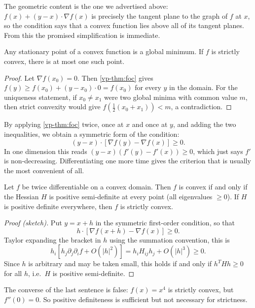The geometric content is the one we advertised above: $f(x) + (y - x)\cdot\nabla f(x)$ is precisely the tangent plane to the graph of $f$ at $x$, so the condition says that a convex function lies above all of its tangent planes. From this the promised simplification is immediate.

\begin{corollary}
	Any stationary point of a convex function is a global minimum. If $f$ is strictly convex, there is at most one such point.
\end{corollary}
\begin{proof}
	Let $\nabla f(x_0) = 0$. Then \autoref{vp-thm:foc} gives $f(y) \geq f(x_0) + (y - x_0)\cdot 0 = f(x_0)$ for every $y$ in the domain. For the uniqueness statement, if $x_0 \neq x_1$ were two global minima with common value $m$, then strict convexity would give $f(\frac{1}{2}(x_0 + x_1)) < m$, a contradiction.
\end{proof}

By applying \autoref{vp-thm:foc} twice, once at $x$ and once at $y$, and adding the two inequalities, we obtain a symmetric form of the condition:
$$
(y - x)\cdot\left[\nabla f(y) - \nabla f(x)\right] \geq 0.
$$
In one dimension this reads $(y-x)(f'(y) - f'(x)) \geq 0$, which just says $f'$ is non-decreasing. Differentiating one more time gives the criterion that is usually the most convenient of all.

\begin{theorem}
	Let $f$ be twice differentiable on a convex domain. Then $f$ is convex if and only if the Hessian $H$ is positive semi-definite at every point (all eigenvalues $\geq 0$). If $H$ is positive definite everywhere, then $f$ is strictly convex.
\end{theorem}
\begin{proof}[Proof (sketch)]
	Put $y = x + h$ in the symmetric first-order condition, so that
	$$
	h \cdot \left[\nabla f(x + h) - \nabla f(x)\right] \geq 0.
	$$
	Taylor expanding the bracket in $h$ using the summation convention, this is
	$$
	h_i\left[h_j \partial_j\partial_i f + O(|h|^2)\right] = h_i H_{ij}h_j + O(|h|^3) \geq 0.
	$$
	Since $h$ is arbitrary and may be taken small, this holds if and only if $h^T H h \geq 0$ for all $h$, i.e.\ $H$ is positive semi-definite.
\end{proof}

\begin{remark}
	The converse of the last sentence is false: $f(x) = x^4$ is strictly convex, but $f''(0) = 0$. So positive definiteness is sufficient but not necessary for strictness.
\end{remark}

